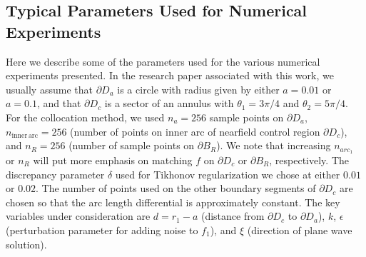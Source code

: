 \documentclass[11pt]{amsart}
\theoremstyle{definition}
\theoremstyle{definition}
\theoremstyle{definition}
\begin{document}
\subsection{Typical Parameters Used for Numerical Experiments\label{subsec:parametersetup}}
Here we describe some of the parameters used for the various numerical experiments presented. In the research paper associated with this work, we usually assume that $\partial D_{a}$ is a circle with radius given by either $a = 0.01$ or $a = 0.1$, and that $\partial D_{c}$ is a sector of an annulus with $\theta_{1} = 3\pi/4$ and $\theta_{2} = 5\pi/4$. For the collocation method, we used $n_{a} = 256$ sample points on $\partial D_{a}$, $n_{\mathrm{inner \, arc}} = 256$ (number of points on inner arc of nearfield control region $\partial D_{c}$), and $n_{R} = 256$ (number of sample points on $\partial B_{R}$). We note that increasing $n_{arc_1}$ or $n_{R}$ will put more emphasis on matching $f$ on $\partial D_{c}$ or $\partial B_{R}$, respectively. The discrepancy parameter $\delta$ used for Tikhonov regularization we chose at either $0.01$ or $0.02$. The number of points used on the other boundary segments of $\partial D_{c}$ are chosen so that the arc length differential is approximately constant. The key variables under consideration are $d = r_{1} - a$ (distance from $\partial D_{c}$ to $\partial D_{a}$), $k$, $\epsilon$ (perturbation parameter for adding noise to $f_{1}$), and $\xi$ (direction of plane wave solution).
\end{document}
